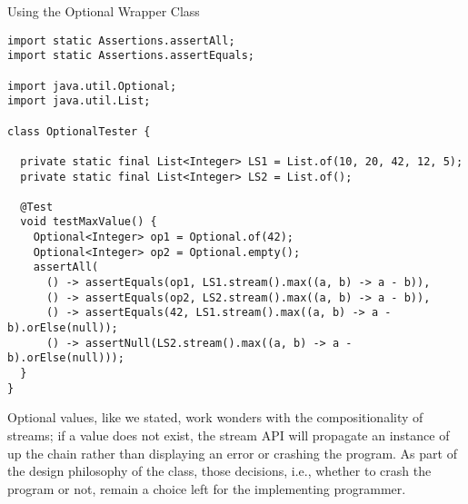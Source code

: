 
\begin{cl}[]{Using the Optional Wrapper Class}
\begin{lstlisting}[language=MyJava]
import static Assertions.assertAll;
import static Assertions.assertEquals;

import java.util.Optional;
import java.util.List;

class OptionalTester {

  private static final List<Integer> LS1 = List.of(10, 20, 42, 12, 5);
  private static final List<Integer> LS2 = List.of();

  @Test
  void testMaxValue() {
    Optional<Integer> op1 = Optional.of(42);
    Optional<Integer> op2 = Optional.empty();
    assertAll(
      () -> assertEquals(op1, LS1.stream().max((a, b) -> a - b)),
      () -> assertEquals(op2, LS2.stream().max((a, b) -> a - b)),
      () -> assertEquals(42, LS1.stream().max((a, b) -> a - b).orElse(null));
      () -> assertNull(LS2.stream().max((a, b) -> a - b).orElse(null)));
  }
}
\end{lstlisting}
\end{cl}

Optional values, like we stated, work wonders with the compositionality of streams; if a value does not exist, the stream API will propagate an  instance of  up the chain rather than displaying an error or crashing the program. As part of the design philosophy of the class, those decisions, i.e., whether to crash the program or not, remain a choice left for the implementing programmer.